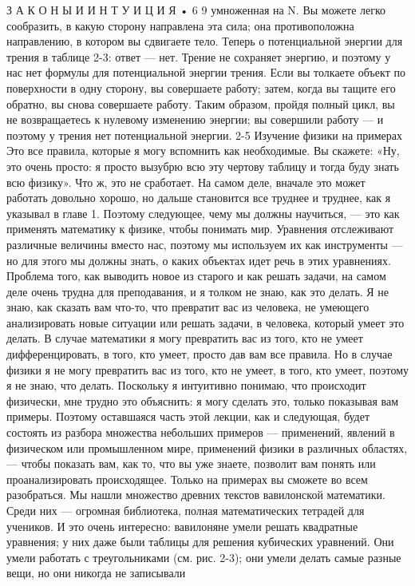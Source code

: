 \documentclass[10pt,oneside]{article}
\begin{document}
З А К О Н Ы  И  И Н Т У И Ц И Я • 6 9 умноженная на N. Вы можете легко сообразить, в какую сторону направлена эта сила; она противоположна направлению, в котором вы сдвигаете тело. Теперь о потенциальной энергии для трения в таблице 2-3: ответ --- нет. Трение не сохраняет энергию, и поэтому у нас нет формулы для потенциальной энергии трения. Если вы толкаете объект по поверхности в одну сторону, вы совершаете работу; затем, когда вы тащите его обратно, вы снова совершаете работу. Таким образом, пройдя полный цикл, вы не возвращаетесь к нулевому изменению энергии; вы совершили работу --- и поэтому у трения нет потенциальной энергии. 2-5 Изучение физики на примерах Это все правила, которые я могу вспомнить как необходимые. Вы скажете: «Ну, это очень просто: я просто вызубрю всю эту чертову таблицу и тогда буду знать всю физику». Что ж, это не сработает. На самом деле, вначале это может работать довольно хорошо, но дальше становится все труднее и труднее, как я указывал в главе 1. Поэтому следующее, чему мы должны научиться, --- это как применять математику к физике, чтобы понимать мир. Уравнения отслеживают различные величины вместо нас, поэтому мы используем их как инструменты --- но для этого мы должны знать, о каких объектах идет речь в этих уравнениях. Проблема того, как выводить новое из старого и как решать задачи, на самом деле очень трудна для преподавания, и я толком не знаю, как это делать. Я не знаю, как сказать вам что-то, что превратит вас из человека, не умеющего анализировать новые ситуации или решать задачи, в человека, который умеет это делать. В случае математики я могу превратить вас из того, кто не умеет дифференцировать, в того, кто умеет, просто дав вам все правила. Но в случае физики я не могу превратить вас из того, кто не умеет, в того, кто умеет, поэтому я не знаю, что делать. Поскольку я интуитивно понимаю, что происходит физически, мне трудно это объяснить: я могу сделать это, только показывая вам примеры. Поэтому оставшаяся часть этой лекции, как и следующая, будет состоять из разбора множества небольших примеров --- применений, явлений в физическом или промышленном мире, применений физики в различных областях, --- чтобы показать вам, как то, что вы уже знаете, позволит вам понять или проанализировать происходящее. Только на примерах вы сможете во всем разобраться. Мы нашли множество древних текстов вавилонской математики. Среди них --- огромная библиотека, полная математических тетрадей для учеников. И это очень интересно: вавилоняне умели решать квадратные уравнения; у них даже были таблицы для решения кубических уравнений. Они умели работать с треугольниками (см. рис. 2-3); они умели делать самые разные вещи, но они никогда не записывали\par
\end{document}

